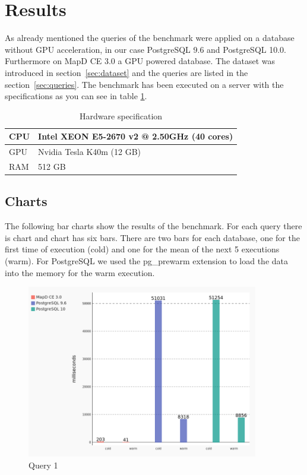 \newpage
\section{Results}
As already mentioned the queries of the benchmark were applied on a database without GPU acceleration,
in our case PostgreSQL 9.6 and PostgreSQL 10.0.
Furthermore on MapD CE 3.0 a GPU powered database.
The dataset was introduced in section~\ref{sec:dataset} and the queries are listed in the section~\ref{sec:queries}.
The benchmark has been executed on a server with the specifications as you can see in table \ref{tab:hardware}.


\begin{table}[H]
\centering
\begin{tabular}{|l|l|}
\hline
CPU & Intel XEON E5-2670 v2 @ 2.50GHz (40 cores)\\ \hline
GPU & Nvidia Tesla K40m (12 GB)\\ \hline
RAM & 512 GB\\
\hline
\end{tabular}
\caption{Hardware specification}
\label{tab:hardware}
\end{table}

\subsection{Charts}
The following bar charts show the results of the benchmark.
For each query there is chart and chart has six bars.
There are two bars for each database, one for the first time of execution (cold) and one for the mean of the next 5 executions (warm).
For PostgreSQL we used the pg\_prewarm extension to load the data into the memory for the warm execution.

\begin{figure}[H]
    \centering
    \includegraphics[width=0.9\textwidth,keepaspectratio]{charts/query_1.png}
    \caption{Query 1}
    \label{fig:query_1}
\end{figure}

